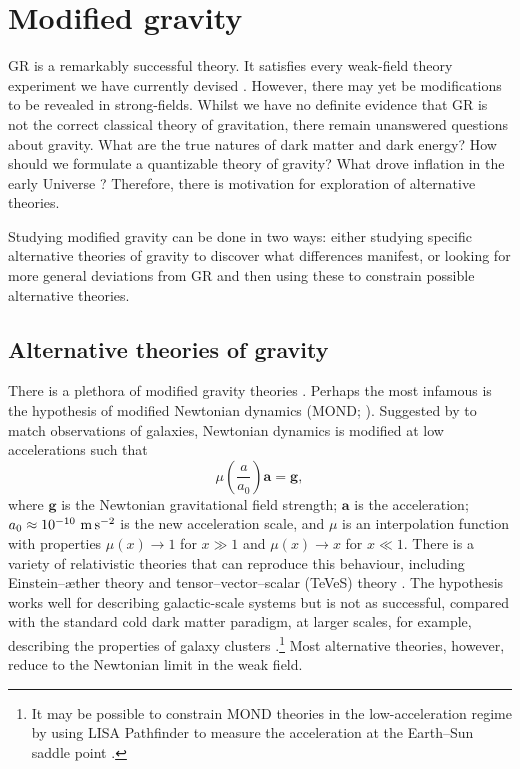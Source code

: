 \section{Modified gravity}\label{sec:alternative}

GR is a remarkably successful theory. It satisfies every weak-field theory experiment we have currently devised \citep{Will2006}. However, there may yet be modifications to be revealed in strong-fields. Whilst we have no definite evidence that GR is not the correct classical theory of gravitation, there remain unanswered questions about gravity. What are the true natures of dark matter and dark energy? How should we formulate a quantizable theory of gravity? What drove inflation in the early Universe \citep{Guth1981,Lyth1999}? Therefore, there is motivation for exploration of alternative theories.

Studying modified gravity can be done in two ways: either studying specific alternative theories of gravity to discover what differences manifest, or looking for more general deviations from GR and then using these to constrain possible alternative theories.

\subsection{Alternative theories of gravity}

There is a plethora of modified gravity theories \citep{Clifton2012}. Perhaps the most infamous is the hypothesis of modified Newtonian dynamics (MOND; \citealt{Famaey2012}). Suggested by \citet{Milgrom1983a,Milgrom1983b,Milgrom1983c} to match observations of galaxies, Newtonian dynamics is modified at low accelerations such that
\begin{equation}
\mu\left(\dfrac{a}{a_0}\right)\boldsymbol{a} = \boldsymbol{g},
\end{equation}
where $\boldsymbol{g}$ is the Newtonian gravitational field strength; $\boldsymbol{a}$ is the acceleration; $a_0 \approx 10^{-10}~\mathrm{m\,s^{-2}}$ is the new acceleration scale, and $\mu$ is an interpolation function with properties $\mu(x) \rightarrow 1$ for $x \gg 1$ and $\mu(x) \rightarrow x$ for $x \ll 1$. There is a variety of relativistic theories that can reproduce this behaviour, including Einstein--\ae{}ther theory and tensor--vector--scalar (TeVeS) theory \citep{Bekenstein2006}. The hypothesis works well for describing galactic-scale systems but is not as successful, compared with the standard cold dark matter paradigm, at larger scales, for example, describing the properties of galaxy clusters \citep{Aguirre2001,Angus2007}.\footnote{It may be possible to constrain MOND theories in the low-acceleration regime by using LISA Pathfinder to measure the acceleration at the Earth--Sun saddle point \citep{Magueijo2011,Galianni2011}.} Most alternative theories, however, reduce to the Newtonian limit in the weak field.

